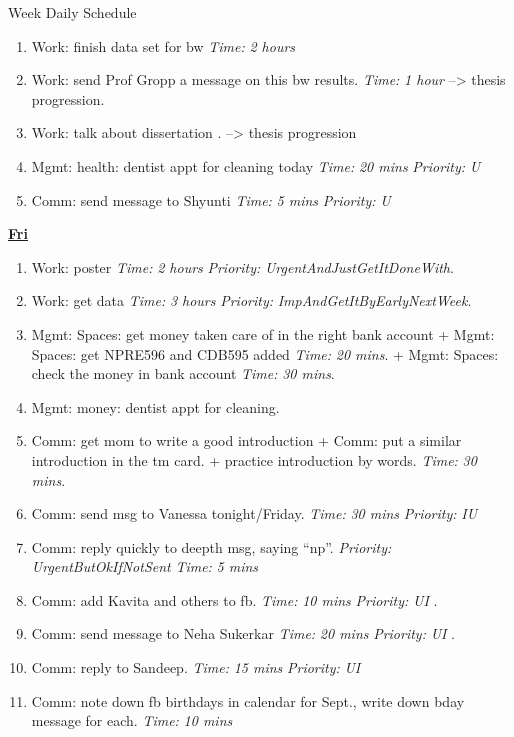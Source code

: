 \documentclass[serif, mathserif, final]{beamer}
\newcommand{\timeEst}[1]{\textit{Time:} \textit{#1}}
\newcommand{\priority}[1]{\textit{Priority:} \textit{#1}}
\begin{document}
\begin{frame}{}
\begin{columns}
\begin{column}{0.50\linewidth}
\begin{block}{Week Daily Schedule}
\begin{enumerate}
\tiny \item \tiny Work: finish data set for bw \timeEst{2 hours}
\item \tiny Work:  send Prof Gropp a message on this bw results. \timeEst{1 hour}  --> thesis progression. 

\item \tiny Work: talk about dissertation . --> thesis progression 


\item \tiny Mgmt: health: dentist appt for cleaning today \timeEst{20 mins} \priority{U} 

\item \tiny Comm: send message to Shyunti \timeEst{5 mins} \priority{U} 


\end{enumerate}


\textbf{\small {\underline{Fri}}} 
\begin{enumerate} 

\item \tiny Work: poster \timeEst{2 hours} \priority{UrgentAndJustGetItDoneWith}. 
\item \tiny Work: get data \timeEst{3 hours} \priority{ImpAndGetItByEarlyNextWeek}. 

\item \tiny Mgmt: Spaces: get money taken care of in the right bank account +  Mgmt: Spaces: get NPRE596 and CDB595 added \timeEst{20 mins}.  + Mgmt: Spaces: check the money in bank account \timeEst{30 mins}. 

\item \tiny Mgmt: money: dentist appt for cleaning. 

\item \tiny Comm: get mom to write a good introduction + Comm: put a similar introduction in the tm card. + practice introduction by words. \timeEst{30 mins}. 
\item \tiny Comm: send msg to Vanessa tonight/Friday. \timeEst{30 mins} \priority{IU} 
\item \tiny Comm: reply quickly to deepth msg, saying ``np''. \priority{UrgentButOkIfNotSent} \timeEst{5 mins} 
\item \tiny Comm: add Kavita and others to fb. \timeEst{10 mins} \priority{UI} .
\item \tiny Comm: send message to Neha Sukerkar \timeEst{20 mins} \priority{UI} .
\item \tiny Comm: reply to Sandeep. \timeEst{15 mins} \priority{UI} 
\item \tiny Comm: note down fb birthdays in calendar for Sept., write down bday message for each. \timeEst{10 mins} 
\end{enumerate}


\end{block}
\end{column}
\end{columns}
\end{frame}
\end{document}

